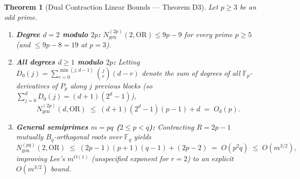 \documentclass[11pt,a4paper]{article}
\newtheorem{theorem}{Theorem}[section]
\theoremstyle{definition}
\newcommand{\F}{\mathbb{F}}
\newcommand{\OR}{\mathrm{OR}}
\newcommand{\Ngen}{N_{\mathrm{gen}}}
\begin{document}
\begin{theorem}[Dual Contraction Linear Bounds --- Theorem D3]
\label{thm:d3}
Let $p \ge 3$ be an odd prime.
\begin{enumerate}[leftmargin=*,nosep]
  \item \textbf{Degree $d = 2$ modulo $2p$:} $\Ngen^{(2p)}(2, \OR) \le 9p - 9$ for every prime $p \ge 5$ (and $\le 9p - 8 = 19$ at $p = 3$).
  \item \textbf{All degrees $d \ge 1$ modulo $2p$:} Letting $D_0(j) = \sum_{r=0}^{\min(j, d-1)} \binom{j}{r}(d - r)$ denote the sum of degrees of all $\F_p$-derivatives of $P_p$ along $j$ previous blocks (so $\sum_{j=0}^d D_0(j) = (d+1)(2^d - 1)$),
  \[
    \Ngen^{(2p)}(d, \OR) \;\le\; (d+1)(2^d - 1)(p - 1) + d \;=\; O_d(p).
  \]
  \item \textbf{General semiprimes $m = pq$ ($2 \le p < q$):} Contracting $R = 2p - 1$ mutually $B_q$-orthogonal roots over $\F_q$ yields
  \[
    \Ngen^{(pq)}(2, \OR) \;\le\; (2p - 1)(p + 1)(q - 1) + (2p - 2) \;=\; O(p^2 q) \;\le\; O(m^{3/2}),
  \]
  improving Lee's $m^{O(1)}$ (unspecified exponent for $r = 2$) to an explicit $O(m^{3/2})$ bound.
\end{enumerate}
\end{theorem}
\end{document}
